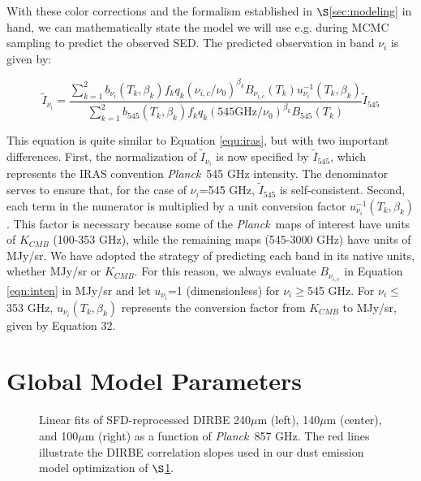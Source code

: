 \documentclass{emulateapj}
\newcommand{\PLANCK}{{\it Planck}}
\begin{document}
With these color corrections and the  formalism established in 
$\S$\ref{sec:modeling} in hand, we can mathematically state the model we will 
use e.g. during MCMC sampling to predict the observed SED. The predicted 
observation in band $\nu_i$ is given by:

\begin{equation}
\label{eqn:inten}
\tilde{I}_{\nu_i} = \frac{\sum\limits_{k=1}^{2} b_{\nu_i}(T_k, \beta_k) f_k q_k (\nu_{i,c}/\nu_0)^{\beta_k} B_{\nu_{i,c}}(T_k) u_{\nu_i}^{-1}(T_k, \beta_k)}{\sum\limits_{k=1}^{2} b_{545}(T_k, \beta_k) f_k q_k (545 \textrm{GHz}/\nu_0)^{\beta_k} B_{545}(T_k)}\tilde{I}_{545}
\end{equation}

This equation is quite similar to Equation \ref{equ:iras}, but with two 
important differences. First, the normalization of $\tilde{I}_{\nu_i}$ is now 
specified by $\tilde{I}_{545}$, which represents the IRAS convention 
\PLANCK~545 GHz intensity. The denominator serves to ensure that, for the case 
of $\nu_i$=545 GHz, $\tilde{I}_{545}$ is self-consistent. Second, each term in 
the numerator is multiplied by a unit conversion factor 
$u_{\nu_i}^{-1}(T_k, \beta_k)$. This factor is necessary because some of the 
\PLANCK~maps of interest have units of $K_{CMB}$ (100-353 GHz), while the
remaining maps (545-3000 GHz) have units of MJy/sr. We have adopted the 
strategy of predicting each band in its native units, whether MJy/sr or 
$K_{CMB}$. For this reason, we always evaluate $B_{\nu_{i,c}}$ in Equation 
\ref{eqn:inten} in MJy/sr and let $u_{\nu_i}$=1 (dimensionless) for 
$\nu_i$$\ge$545 GHz. For $\nu_i$$\le$353 GHz, $u_{\nu_i}(T_k, \beta_k)$ 
represents the conversion factor from $K_{CMB}$ to MJy/sr, given by 
\cite{planckresponse} Equation 32.

\section{Global Model Parameters}
\label{sec:global}

\begin{figure*}
\begin{center}
\caption{\label{fig:dirbe_slopes} Linear fits of SFD-reprocessed DIRBE 
240$\mu$m (left), 140$\mu$m (center), and 100$\mu$m (right) as a function of 
\PLANCK~857 GHz. The red lines illustrate the DIRBE correlation slopes used in 
our dust emission model optimization of $\S$\ref{sec:global}.}
\end{center}
\end{figure*}
\end{document}
